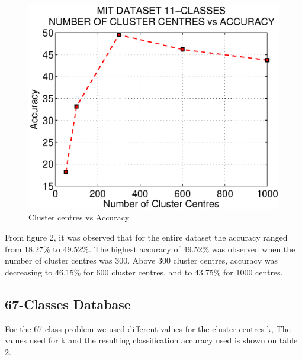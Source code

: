 \documentclass[10pt,twocolumn,letterpaper]{article}
\begin{document}
\begin{figure}[h]
      \centering
      \includegraphics[width=0.7\linewidth]{img/11c.eps}
      \caption{Cluster centres vs Accuracy}
\end{figure}

From figure 2, it was observed that for the entire dataset the accuracy ranged from 18.27\% to 49.52\%. The highest accuracy of 49.52\% was observed when the number of cluster centres was 300. Above 300 cluster centres, accuracy was decreasing to 46.15\% for 600 cluster centres, and to 43.75\% for 1000 centres.


\subsection{67-Classes Database}
For the 67 class problem we used different values for the cluster centres k, The values used for k and the resulting classification accuracy used is shown on table 2.
\end{document}
